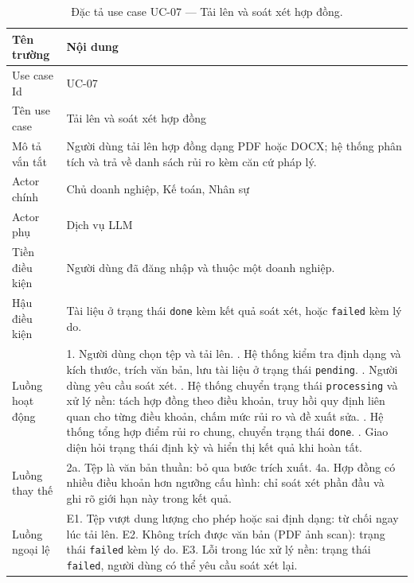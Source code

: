 \documentclass[12pt,a4paper]{report}
\numberwithin{equation}{chapter}
\numberwithin{figure}{chapter}
\numberwithin{table}{chapter}
\begin{document}
\begin{table}[htp]
    \centering
    \caption{Đặc tả use case UC-07 --- Tải lên và soát xét hợp đồng.}
    \label{tab:uc07}
    \begin{tabular}{p{3.4cm}p{10.6cm}}
        \toprule
        \textbf{Tên trường} & \textbf{Nội dung} \\
        \midrule
        Use case Id & UC-07 \\
        Tên use case & Tải lên và soát xét hợp đồng \\
        Mô tả vắn tắt & Người dùng tải lên hợp đồng dạng PDF hoặc DOCX; hệ thống
        phân tích và trả về danh sách rủi ro kèm căn cứ pháp lý. \\
        Actor chính & Chủ doanh nghiệp, Kế toán, Nhân sự \\
        Actor phụ & Dịch vụ LLM \\
        Tiền điều kiện & Người dùng đã đăng nhập và thuộc một doanh nghiệp. \\
        Hậu điều kiện & Tài liệu ở trạng thái \texttt{done} kèm kết quả soát xét,
        hoặc \texttt{failed} kèm lý do. \\
        Luồng hoạt động & 1. Người dùng chọn tệp và tải lên. \newline
        2. Hệ thống kiểm tra định dạng và kích thước, trích văn bản, lưu tài
        liệu ở trạng thái \texttt{pending}. \newline
        3. Người dùng yêu cầu soát xét. \newline
        4. Hệ thống chuyển trạng thái \texttt{processing} và xử lý nền: tách hợp
        đồng theo điều khoản, truy hồi quy định liên quan cho từng điều khoản,
        chấm mức rủi ro và đề xuất sửa. \newline
        5. Hệ thống tổng hợp điểm rủi ro chung, chuyển trạng thái \texttt{done}. \newline
        6. Giao diện hỏi trạng thái định kỳ và hiển thị kết quả khi hoàn tất. \\
        Luồng thay thế & 2a. Tệp là văn bản thuần: bỏ qua bước trích xuất. \newline
        4a. Hợp đồng có nhiều điều khoản hơn ngưỡng cấu hình: chỉ soát xét phần
        đầu và ghi rõ giới hạn này trong kết quả. \\
        Luồng ngoại lệ & E1. Tệp vượt dung lượng cho phép hoặc sai định dạng: từ
        chối ngay lúc tải lên. \newline
        E2. Không trích được văn bản (PDF ảnh scan): trạng thái \texttt{failed}
        kèm lý do. \newline
        E3. Lỗi trong lúc xử lý nền: trạng thái \texttt{failed}, người dùng có
        thể yêu cầu soát xét lại. \\
        \bottomrule
    \end{tabular}
\end{table}
\end{document}
